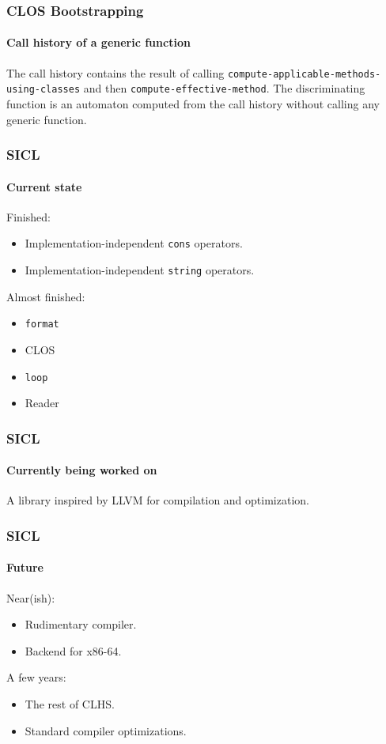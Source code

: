 \documentclass{beamer}
\begin{document}
\begin{frame}
  \frametitle{CLOS Bootstrapping}
  \framesubtitle{Call history of a generic function}

The call history contains the result of calling
\texttt{compute-applicable-methods-using-classes} and then
\texttt{compute-effective-method}.
\vskip 0.25cm
The discriminating function is an automaton computed from the call
history without calling any generic function.

\end{frame}
\begin{frame}
  \frametitle{SICL}
  \framesubtitle{Current state}
Finished:
\vskip 0.25cm
\begin{itemize}
\item Implementation-independent \texttt{cons} operators. 
\item Implementation-independent \texttt{string} operators.
\end{itemize}
\vskip 0.5cm
Almost finished:
\vskip 0.25cm
\begin{itemize}
\item \texttt{format}
\item CLOS
\item \texttt{loop}
\item Reader
\end{itemize}

\end{frame}
\begin{frame}
  \frametitle{SICL}
  \framesubtitle{Currently being worked on}

A library inspired by LLVM for compilation and optimization. 

\end{frame}
\begin{frame}
  \frametitle{SICL}
  \framesubtitle{Future}

Near(ish):
\begin{itemize}
\item Rudimentary compiler.
\item Backend for x86-64.
\end{itemize}
\vskip 0.5cm
  
A few years:
\begin{itemize}
\item The rest of CLHS.
\item Standard compiler optimizations.
\end{itemize}

\end{frame}
\end{document}
